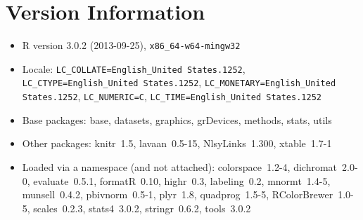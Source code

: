 \documentclass{article}\usepackage[]{graphicx}\usepackage[]{color}
\begin{document}
\section{Version Information}
\begin{itemize}\raggedright
  \item R version 3.0.2 (2013-09-25), \verb|x86_64-w64-mingw32|
  \item Locale: \verb|LC_COLLATE=English_United States.1252|, \verb|LC_CTYPE=English_United States.1252|, \verb|LC_MONETARY=English_United States.1252|, \verb|LC_NUMERIC=C|, \verb|LC_TIME=English_United States.1252|
  \item Base packages: base, datasets, graphics, grDevices, methods, stats,
    utils
  \item Other packages: knitr~1.5, lavaan~0.5-15, NlsyLinks~1.300,
    xtable~1.7-1
  \item Loaded via a namespace (and not attached): colorspace~1.2-4,
    dichromat~2.0-0, evaluate~0.5.1, formatR~0.10, highr~0.3, labeling~0.2,
    mnormt~1.4-5, munsell~0.4.2, pbivnorm~0.5-1, plyr~1.8, quadprog~1.5-5,
    RColorBrewer~1.0-5, scales~0.2.3, stats4~3.0.2, stringr~0.6.2, tools~3.0.2
\end{itemize}



\end{document}
